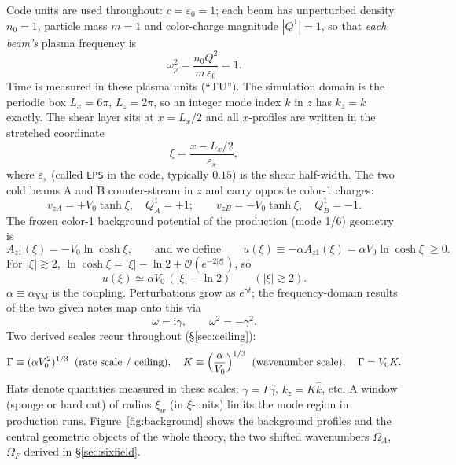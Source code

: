\documentclass[11pt,a4paper]{article}
\numberwithin{equation}{section}
\theoremstyle{remark}
\newcommand{\eps}{\varepsilon_s}                 %
\newcommand{\Vo}{V_0}
\newcommand{\kz}{k_z}
\newcommand{\OmA}{\Omega_A}
\newcommand{\OmF}{\Omega_F}
\newcommand{\Az}{A_{z1}}
\newcommand{\Ceil}{\Gamma}                        %
\newcommand{\Kwn}{K}                              %
\newcommand{\ii}{\mathrm{i}}
\begin{document}
Code units are used throughout: $c=\varepsilon_0=1$; each beam has
unperturbed density $n_0=1$, particle mass $m=1$ and color-charge magnitude
$|Q^1|=1$, so that \emph{each beam's} plasma frequency is
\begin{equation}
\omega_p^2=\frac{n_0 Q^2}{m\,\varepsilon_0}=1 .
\label{eq:omegap}
\end{equation}
Time is measured in these plasma units (``TU''). The simulation domain is
the periodic box $L_x=6\pi$, $L_z=2\pi$, so an integer mode index $k$ in
$z$ has $\kz=k$ exactly. The shear layer sits at $x=L_x/2$ and all
$x$-profiles are written in the stretched coordinate
\begin{equation}
\xi=\frac{x-L_x/2}{\eps},
\end{equation}
where $\eps$ (called \texttt{EPS} in the code, typically $0.15$) is the
shear half-width. The two cold beams A and B counter-stream in $z$ and carry
opposite color-1 charges:
\begin{equation}
v_{zA}=+\Vo\tanh\xi,\quad Q^1_A=+1;\qquad
v_{zB}=-\Vo\tanh\xi,\quad Q^1_B=-1 .
\label{eq:beams}
\end{equation}
The frozen color-1 background potential of the production (mode 1/6)
geometry is
\begin{equation}
\Az(\xi)=-\Vo\ln\cosh\xi ,
\qquad\text{and we define}\qquad
u(\xi)\equiv-\alpha\Az(\xi)=\alpha\Vo\ln\cosh\xi\;\ge 0 .
\label{eq:Az1}
\end{equation}
For $|\xi|\gtrsim2$, $\ln\cosh\xi=|\xi|-\ln2+\mathcal O(e^{-2|\xi|})$, so
\begin{equation}
u(\xi)\simeq\alpha\Vo\,(|\xi|-\ln 2)
\qquad(|\xi|\gtrsim 2).
\label{eq:usat}
\end{equation}
$\alpha\equiv\alpha_{\mathrm{YM}}$ is the coupling. Perturbations grow as
$e^{\gamma t}$; the frequency-domain results of the two given notes map onto
this via
\begin{equation}
\omega=\ii\gamma,\qquad \omega^2=-\gamma^2 .
\label{eq:omegagamma}
\end{equation}
Two derived scales recur throughout (\S\ref{sec:ceiling}):
\begin{equation}
\Ceil\equiv(\alpha\Vo^2)^{1/3}\;\;\text{(rate scale / ceiling)},
\quad
\Kwn\equiv\Bigl(\frac{\alpha}{\Vo}\Bigr)^{1/3}\;\;\text{(wavenumber scale)},
\quad \Ceil=\Vo \Kwn .
\label{eq:scales}
\end{equation}
Hats denote quantities measured in these scales:
$\gamma=\Ceil\hat\gamma$, $\kz=\Kwn\hat k$, etc.
A window (sponge or hard cut) of radius $\xi_w$ (in $\xi$-units) limits the
mode region in production runs. Figure~\ref{fig:background} shows the
background profiles and the central geometric objects of the whole theory,
the two shifted wavenumbers $\OmA$, $\OmF$ derived in
\S\ref{sec:sixfield}.
\end{document}

